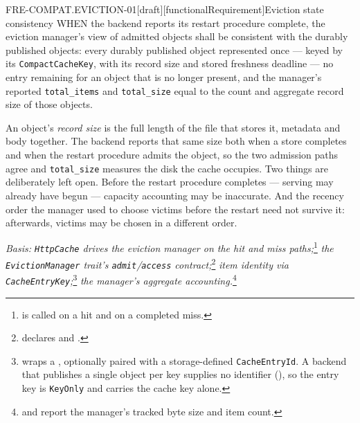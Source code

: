 \begin{requirement}{FRE-COMPAT.EVICTION-01}[draft][functionalRequirement]{Eviction state consistency}
  WHEN the backend reports its restart procedure complete, the eviction
  manager's view of admitted objects shall be consistent with the durably
  published objects: every durably published object represented once ---
  keyed by its \texttt{CompactCacheKey}, with its record size and stored
  freshness deadline --- no entry remaining for an object that is no longer
  present, and the manager's reported \texttt{total\_items} and
  \texttt{total\_size} equal to the count and aggregate record size of those
  objects.

  An object's \emph{record size} is the full length of the file that stores
  it, metadata and body together. The backend reports that same size both
  when a store completes and when the restart procedure admits the object, so
  the two admission paths agree and \texttt{total\_size} measures the disk
  the cache occupies. Two things are deliberately left open. Before the
  restart procedure completes --- serving may already have begun ---
  capacity accounting may be inaccurate. And the recency order the manager
  used to choose victims before the restart need not survive it: afterwards,
  victims may be chosen in a different order.

  \textit{Basis: \texttt{HttpCache} drives the eviction manager on the hit
  and miss paths;}\footnote{
  is called on a hit and
   on a
  completed miss.} \textit{the \texttt{EvictionManager} trait's
  \texttt{admit}/\texttt{access}
  contract;}\footnote{
  declares  and
  .} \textit{item
  identity via
  \texttt{CacheEntryKey};}\footnote{
  wraps a ,
  optionally paired with a storage-defined \texttt{CacheEntryId}. A backend that
  publishes a single object per key supplies no identifier
  (), so the entry key is \texttt{KeyOnly} and
  carries the cache key alone.}
  \textit{the manager's aggregate
  accounting.}\footnote{
  and 
  report the manager's tracked byte size and item count.}


\end{requirement}
